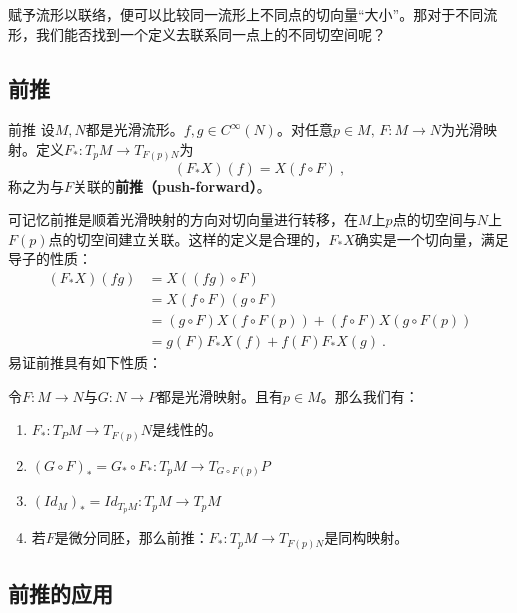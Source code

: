 

\begin{issues}
\end{issues}

赋予流形以联络，便可以比较同一流形上不同点的切向量“大小”。那对于不同流形，我们能否找到一个定义去联系同一点上的不同切空间呢？
\subsection{前推}
\begin{definition}{前推}
设$M,N$都是光滑流形。$f,g\in C^{\infty}(N)$。对任意$p\in M,\,F:M\rightarrow N$为光滑映射。定义$F_*:T_p M\rightarrow T_{F(p)N}$为
\begin{equation}
(F_*X)(f)=X(f\circ F)~,
\end{equation}
称之为与$F$关联的\textbf{前推（push-forward）}。
\end{definition}
可记忆前推是顺着光滑映射的方向对切向量进行转移，在$M$上$p$点的切空间与$N$上$F(p)$点的切空间建立关联。这样的定义是合理的，$F_*X$确实是一个切向量，满足导子的性质：
\begin{equation}
\begin{aligned}
(F_*X)(fg)&=X((fg)\circ F)\\
&=X(f\circ F)(g\circ F)\\
&=(g\circ F)X(f\circ F(p))+(f\circ F)X(g\circ F(p))\\
&=g(F)F_*X(f)+f(F)F_*X(g)~.
\end{aligned}
\end{equation}
易证前推具有如下性质：
\begin{lemma}{}
令$F:M\rightarrow N$与$G:N\rightarrow P$都是光滑映射。且有$p\in M$。那么我们有：
\begin{enumerate}
\item $F_*:T_P M\rightarrow T_{F(p)}N$是线性的。
\item $(G\circ F)_*=G_*\circ F_*:T_p M\rightarrow T_{G\circ F(p)}P$
\item $(Id_M)_*=Id_{T_p M}:T_p M\rightarrow T_p M$
\item 若$F$是微分同胚，那么前推：$F_*: T_p M\rightarrow T_{F(p)N}$是同构映射。
\end{enumerate}
\end{lemma}


\subsection{前推的应用}
